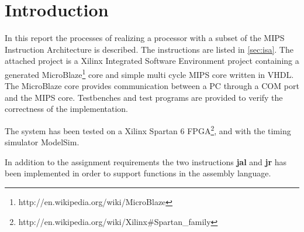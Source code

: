 \section{Introduction}

In this report the processes of realizing a processor with a subset of 
the MIPS Instruction Architecture is described. The instructions are listed 
in \ref{sec:isa}. The attached project is a Xilinx Integrated Software Environment 
project containing a generated MicroBlaze\footnote{http://en.wikipedia.org/wiki/MicroBlaze} 
core and simple multi cycle MIPS core written in VHDL. The MicroBlaze core provides 
communication between a PC through a COM port and the MIPS core. Testbenches and 
test programs are provided to verify the correctness of the implementation. 

The system has been tested on a Xilinx Spartan 6 FPGA\footnote{http://en.wikipedia.org/wiki/Xilinx\#Spartan\_family}, 
and with the timing simulator ModelSim.

In addition to the assignment requirements the two instructions {\bf jal} and {\bf jr} has been implemented in 
order to support functions in the assembly language. 
